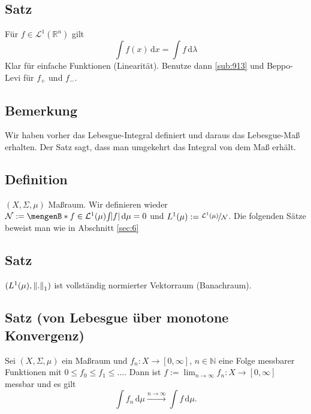\subsection[Satz: Das Lebesgue-Maß definiert das Lebesgue-Integral!]{Satz} %
\label{sub:918}
Für $f \in \mathcal{L}^1(\mathds{R}^n)$ gilt
\[
	\int\! f(x)  \, \mathrm{d}x  = \int\! f  \, \mathrm{d}\lambda 
\]
Klar für einfache Funktionen (Linearität). Benutze dann \ref{sub:913} und Beppo-Levi für $f_+$ und $f_-$. \bewende

\subsection[Bemerkung: Aussage von Satz \ref{sub:918}]{Bemerkung} %
\label{sub:919}
Wir haben vorher das Lebesgue-Integral definiert und daraus das Lebesgue-Maß erhalten. Der Satz sagt, dass man umgekehrt das Integral von dem Maß erhält.

\subsection[Definition: Quotientenvektorraum $L^1(\mu)$]{Definition} %
\label{sub:920}
$(X, \Sigma, \mu)$ Maßraum. Wir definieren wieder $\mathcal{N} := \set[f \in \mathcal{L}^1(\mu)]{\int\! \abs{f}  \, \mathrm{d}\mu = 0 } $ und $L^1(\mu) := \nicefrac{\mathcal{L}^1(\mu)}{\mathcal{N}}$.
\bigskip
Die folgenden Sätze beweist man wie in Abschnitt \ref{sec:6}

\subsection[Satz: $L^1(\mu)$ ist ein Banachraum]{Satz} %
\label{sub:921}
$(L^1(\mu), \norm[1]{.} )$ ist vollständig normierter Vektorraum (Banachraum).

\subsection{Satz (von Lebesgue über monotone Konvergenz)} %
\label{sub:922}
Sei $(X, \Sigma, \mu)$ ein Maßraum und $f_n : X \to [0,\infty]$, $n \in \mathds{N}$ eine Folge messbarer Funktionen mit $0 \le f_0 \le f_1 \le \ldots $. Dann ist 
$f := \lim_{ n \to \infty} f_n : X \to [0,\infty]$ messbar und es gilt
\[
	\int\! f_n  \, \mathrm{d}\mu \xrightarrow{n \to \infty} \int\! f  \, \mathrm{d}\mu.
\]

